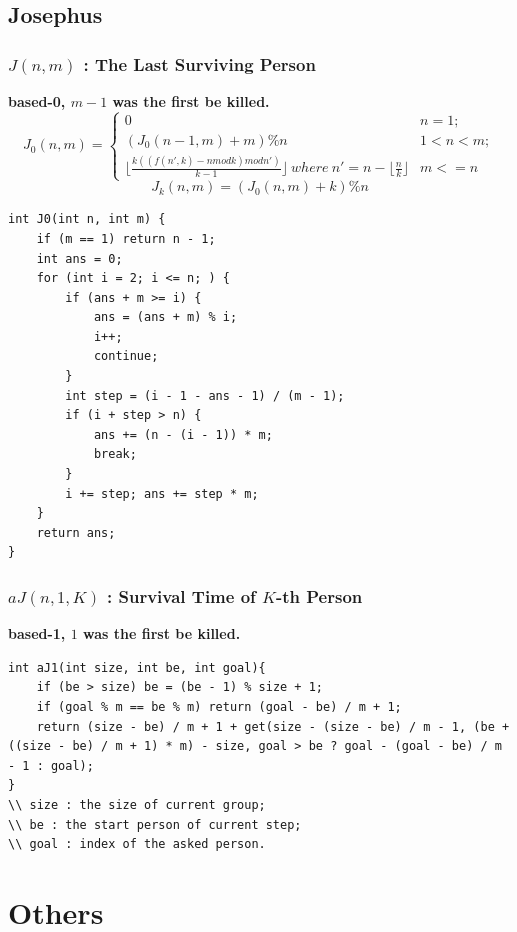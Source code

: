 \documentclass[10pt]{ctexart}
\begin{document}
{{\subsection{Josephus}
\subsubsection{$J(n, m)$ : The Last Surviving Person}
\textbf{based-0, $m - 1$ was the first be killed.}
\[
    J_0(n, m) = 
    \begin{cases}
        0 & n = 1; \\
        (J_0(n - 1, m) + m) \% n & 1 < n < m; \\
        \lfloor \frac{k((f(n', k) - n mod k) mod n')}{k - 1} \rfloor \ where \ n' = n - \lfloor \frac{n}{k} \rfloor & m <= n
    \end{cases}
\]
$$J_k(n, m) = (J_0(n, m) + k) \% n$$
\begin{lstlisting}
int J0(int n, int m) {
    if (m == 1) return n - 1;
    int ans = 0;
    for (int i = 2; i <= n; ) {
        if (ans + m >= i) {
            ans = (ans + m) % i;
            i++;
            continue;
        }
        int step = (i - 1 - ans - 1) / (m - 1);
        if (i + step > n) {
            ans += (n - (i - 1)) * m;
            break;
        }
        i += step; ans += step * m;
    }
    return ans;
}
\end{lstlisting}
\subsubsection{$aJ(n, 1, K)$ : Survival Time of $K$-th Person}
\textbf{based-1, $1$ was the first be killed.}
\begin{lstlisting}
int aJ1(int size, int be, int goal){
	if (be > size) be = (be - 1) % size + 1;
	if (goal % m == be % m) return (goal - be) / m + 1;
	return (size - be) / m + 1 + get(size - (size - be) / m - 1, (be + ((size - be) / m + 1) * m) - size, goal > be ? goal - (goal - be) / m - 1 : goal);
}
\\ size : the size of current group;
\\ be : the start person of current step;
\\ goal : index of the asked person.
\end{lstlisting}



\newpage
\section{Others}
}}
\end{document}
